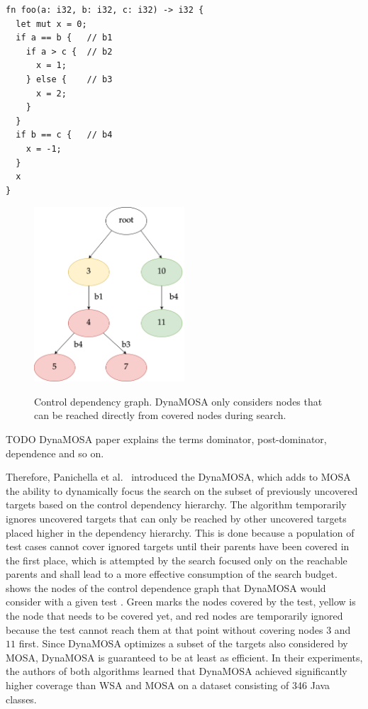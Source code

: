 \documentclass[paper=a4,%
  twoside,%
  BCOR4mm,%
  abstract=true,%
  toc=bibliography,%
  chapterprefix=true,%
  toc=bibliographynumbered,%
  open=right,%
  english,%
  pagesize=pdftex]{scrreprt}
\begin{document}
\begin{lstlisting}[style=boxed, caption={A nested function with control dependent blocks}, label=lst:example-control-dependencies]
fn foo(a: i32, b: i32, c: i32) -> i32 {
  let mut x = 0;
  if a == b {   // b1
    if a > c {  // b2
      x = 1;
    } else {    // b3
      x = 2;
    }
  }
  if b == c {   // b4
    x = -1;
  }
  x
}
\end{lstlisting}

\begin{figure}[h]
\caption{Control dependency graph. DynaMOSA only considers nodes that can be reached directly from covered nodes during search.}
\centering
\includegraphics[width=0.5\textwidth]{cdg-code-example}
\label{fig:example-control-dependencies}
\end{figure}

TODO DynaMOSA paper explains the terms dominator, post-dominator, dependence and so on.

Therefore, Panichella et al.~\cite{Panichella2018} introduced the \ac{DynaMOSA}, which adds to \ac{MOSA} the ability to dynamically focus the search on the subset of previously uncovered targets based on the control dependency hierarchy. The algorithm temporarily ignores uncovered targets that can only be reached by other uncovered targets placed higher in the dependency hierarchy. This is done because a population of test cases cannot cover ignored targets until their parents have been covered in the first place, which is attempted by the search focused only on the reachable parents and shall lead to a more effective consumption of the search budget.  shows the nodes of the control dependence graph that \ac{DynaMOSA} would consider with a given test . Green marks the nodes covered by the test, yellow is the node that needs to be covered yet, and red nodes are temporarily ignored because the test cannot reach them at that point without covering nodes $3$ and $11$ first. Since \ac{DynaMOSA} optimizes a subset of the targets also considered by \ac{MOSA}, \ac{DynaMOSA} is guaranteed to be at least as efficient. In their experiments, the authors of both algorithms learned that \ac{DynaMOSA} achieved significantly higher coverage than \ac{WSA} and \ac{MOSA} on a dataset consisting of 346 Java classes.
\end{document}
